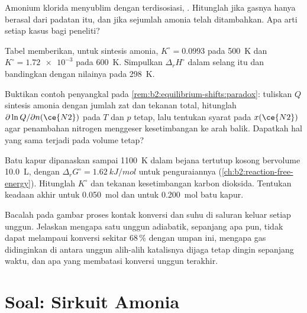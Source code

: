\begin{exercise}[$\star\star$]\label{exo:b2:equilibrium-shifts:8}
Amonium klorida menyublim dengan terdisosiasi, . Hitunglah  jika gasnya hanya berasal dari padatan itu, dan
jika sejumlah amonia telah ditambahkan. Apa arti setiap kasus bagi
peneliti?
\end{exercise}

\begin{exercise}[$\star\star$]\label{exo:b2:equilibrium-shifts:9}
Tabel memberikan, untuk sintesis amonia, $K^\circ = 0.0993$ pada
\qty{500}{K} dan $K^\circ = \num{1.72e-3}$ pada \qty{600}{K}. Simpulkan
$\Delta_r H^\circ$ dalam selang itu dan bandingkan dengan nilainya pada
\qty{298}{K}.
\end{exercise}

\begin{exercise}[$\star\star\star$]\label{exo:b2:equilibrium-shifts:10}
Buktikan contoh penyangkal pada \cref{rem:b2:equilibrium-shifts:paradox}:
tuliskan $Q$ sintesis amonia dengan jumlah zat dan tekanan total, hitunglah
$\partial\ln Q/\partial n(\ce{N2})$ pada $T$ dan $p$ tetap, lalu tentukan
syarat pada $x(\ce{N2})$ agar penambahan nitrogen menggeser kesetimbangan
ke arah balik. Dapatkah hal yang sama terjadi pada volume tetap?
\end{exercise}

\begin{exercise}[$\star\star\star$]\label{exo:b2:equilibrium-shifts:11}
Batu kapur dipanaskan sampai \qty{1100}{K} dalam bejana tertutup kosong
bervolume \qty{10.0}{L}, dengan $\Delta_r G^\circ = \qty{1.62}{kJ/mol}$
untuk penguraiannya (\cref{ch:b2:reaction-free-energy}). Hitunglah
$K^\circ$ dan tekanan kesetimbangan karbon dioksida. Tentukan keadaan
akhir untuk \qty{0.050}{mol} dan untuk \qty{0.200}{mol} batu kapur.
\end{exercise}

\begin{exercise}[$\star\star\star$]\label{exo:b2:equilibrium-shifts:12}
Bacalah pada gambar proses kontak konversi dan suhu di saluran keluar
setiap unggun. Jelaskan mengapa satu unggun adiabatik, sepanjang apa pun,
tidak dapat melampaui konversi sekitar 68\,\% dengan umpan ini, mengapa gas
didinginkan di antara unggun alih-alih katalisnya dijaga tetap dingin
sepanjang waktu, dan apa yang membatasi konversi unggun terakhir.
\end{exercise}

\section{Soal: Sirkuit Amonia}

